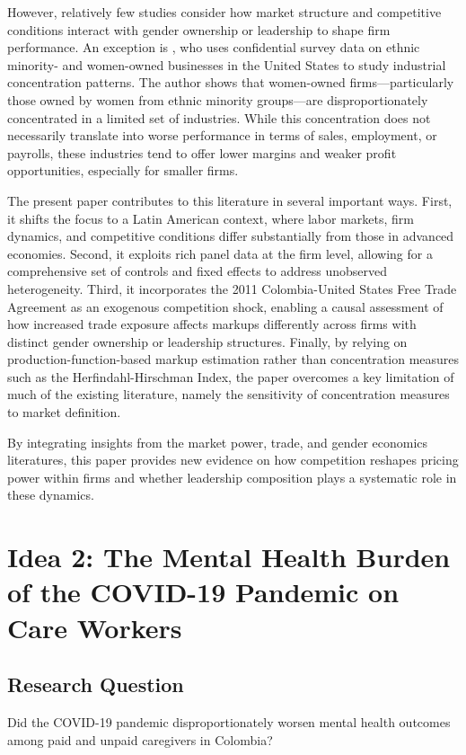 \documentclass[11pt]{article}
\begin{document}
However, relatively few studies consider how market structure and competitive conditions interact with gender ownership or leadership to shape firm performance. An exception is \cite{wang_industrial_2013}, who uses confidential survey data on ethnic minority- and women-owned businesses in the United States to study industrial concentration patterns. The author shows that women-owned firms—particularly those owned by women from ethnic minority groups—are disproportionately concentrated in a limited set of industries. While this concentration does not necessarily translate into worse performance in terms of sales, employment, or payrolls, these industries tend to offer lower margins and weaker profit opportunities, especially for smaller firms.

The present paper contributes to this literature in several important ways. First, it shifts the focus to a Latin American context, where labor markets, firm dynamics, and competitive conditions differ substantially from those in advanced economies. Second, it exploits rich panel data at the firm level, allowing for a comprehensive set of controls and fixed effects to address unobserved heterogeneity. Third, it incorporates the 2011 Colombia-United States Free Trade Agreement as an exogenous competition shock, enabling a causal assessment of how increased trade exposure affects markups differently across firms with distinct gender ownership or leadership structures. Finally, by relying on production-function-based markup estimation rather than concentration measures such as the Herfindahl-Hirschman Index, the paper overcomes a key limitation of much of the existing literature, namely the sensitivity of concentration measures to market definition.

By integrating insights from the market power, trade, and gender economics literatures, this paper provides new evidence on how competition reshapes pricing power within firms and whether leadership composition plays a systematic role in these dynamics.

\vspace{0.6cm}

\section{Idea 2: The Mental Health Burden of the COVID-19 Pandemic on Care Workers}

\subsection*{Research Question}
Did the COVID-19 pandemic disproportionately worsen mental health outcomes among paid and unpaid caregivers in Colombia?
\end{document}
